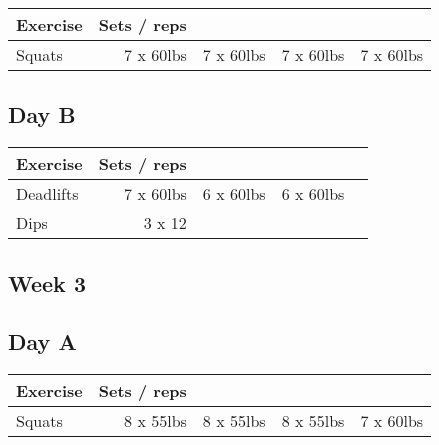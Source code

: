 \documentclass[12pt, a4paper]{article}%
\begin{document}
  \begin{tabular}{l|rrrr}
  \hspace{0.75em} \textbf{Exercise} & \textbf{Sets / reps} \\ \hline

            \hspace{0.75em} Squats
            & 7 x 60lbs
            & 7 x 60lbs
            & 7 x 60lbs
            & 7 x 60lbs
            \\


  \end{tabular}

  \subsection*{\hspace{0.5em} Day B }


  \begin{tabular}{l|rrrr}
  \hspace{0.75em} \textbf{Exercise} & \textbf{Sets / reps} \\ \hline

            \hspace{0.75em} Deadlifts
            & 7 x 60lbs
            & 6 x 60lbs
            & 6 x 60lbs
            & 
            \\


   \hspace{0.75em} Dips & 3 x 12 \\
  \end{tabular}

 \subsection*{\hspace{0.25em} Week 3 }
  \subsection*{\hspace{0.5em} Day A }


  \begin{tabular}{l|rrrr}
  \hspace{0.75em} \textbf{Exercise} & \textbf{Sets / reps} \\ \hline

            \hspace{0.75em} Squats
            & 8 x 55lbs
            & 8 x 55lbs
            & 8 x 55lbs
            & 7 x 60lbs
            \\


  \end{tabular}
\end{document}
